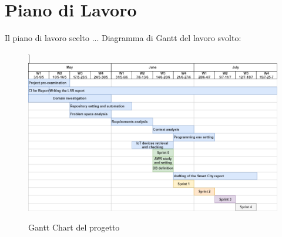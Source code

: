 

\chapter{Piano di Lavoro}
Il piano di lavoro scelto ...
Diagramma di Gantt del lavoro svolto:
\begin{figure}[H]
    \caption{Gantt Chart del progetto}
    \label{fig:Gantt}] 
    \centering
   \includegraphics[width=1\textwidth]{DrawIo/GanttChart.png}
\end{figure}
